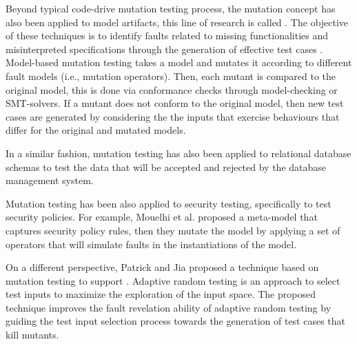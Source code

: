 
Beyond typical code-drive mutation testing process, the mutation concept has also been applied to model artifacts, this line of research is called . The objective of these techniques is to identify faults related to missing functionalities and misinterpreted specifications through the generation of effective test cases \cite{devroey2016featured,belli2016model}.
Model-based mutation testing takes a model and mutates it according to different fault models (i.e., mutation operators). Then, each mutant is compared to the original model, this is done via conformance checks through model-checking or SMT-solvers. If a mutant does not conform to the original model, then new test cases are generated by considering the the inputs that exercise behaviours that differ for the original and mutated models\cite{8411732}.

In a similar fashion, mutation testing has also been applied to relational database schemas \cite{wright2013efficient} to test the data that will be accepted and rejected by the database management system.


Mutation testing has been also applied to security testing, specifically to test security policies. For example, Mouelhi et al. \cite{mouelhiv2008generic} proposed a meta-model that captures security policy rules, then they mutate the model by applying a set of operators that will simulate faults in the instantiations of the model. 

On a different perspective, Patrick and Jia \cite{patrick2015kernel} proposed a technique based on mutation testing to support .
Adaptive random testing is an approach to select test inputs to maximize the exploration of the input space.
The proposed technique improves the fault revelation ability of adaptive random testing by guiding the test input selection process towards the generation of test cases that kill mutants.

